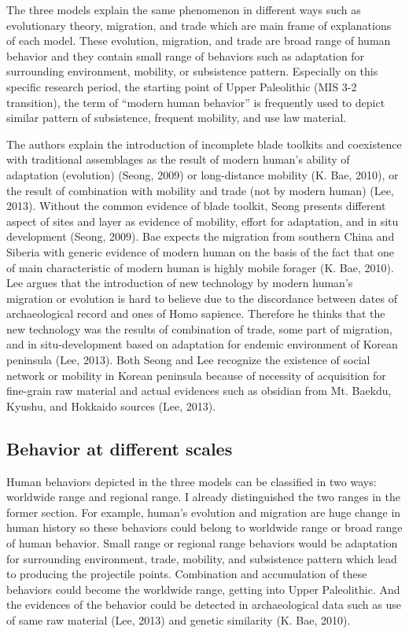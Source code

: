 \documentclass[american,man]{apa6}
\begin{document}
The three models explain the same phenomenon in different ways such as
evolutionary theory, migration, and trade which are main frame of
explanations of each model. These evolution, migration, and trade are
broad range of human behavior and they contain small range of behaviors
such as adaptation for surrounding environment, mobility, or subsistence
pattern. Especially on this specific research period, the starting point
of Upper Paleolithic (MIS 3-2 transition), the term of \enquote{modern
human behavior} is frequently used to depict similar pattern of
subsistence, frequent mobility, and use law material.

The authors explain the introduction of incomplete blade toolkits and
coexistence with traditional assemblages as the result of modern human's
ability of adaptation (evolution) (Seong, 2009) or long-distance
mobility (K. Bae, 2010), or the result of combination with mobility and
trade (not by modern human) (Lee, 2013). Without the common evidence of
blade toolkit, Seong presents different aspect of sites and layer as
evidence of mobility, effort for adaptation, and in situ development
(Seong, 2009). Bae expects the migration from southern China and Siberia
with generic evidence of modern human on the basis of the fact that one
of main characteristic of modern human is highly mobile forager (K. Bae,
2010). Lee argues that the introduction of new technology by modern
human's migration or evolution is hard to believe due to the discordance
between dates of archaeological record and ones of Homo sapience.
Therefore he thinks that the new technology was the results of
combination of trade, some part of migration, and in situ-development
based on adaptation for endemic environment of Korean peninsula (Lee,
2013). Both Seong and Lee recognize the existence of social network or
mobility in Korean peninsula because of necessity of acquisition for
fine-grain raw material and actual evidences such as obsidian from Mt.
Baekdu, Kyushu, and Hokkaido sources (Lee, 2013).

\subsection{Behavior at different
scales}\label{behavior-at-different-scales}

Human behaviors depicted in the three models can be classified in two
ways: worldwide range and regional range. I already distinguished the
two ranges in the former section. For example, human's evolution and
migration are huge change in human history so these behaviors could
belong to worldwide range or broad range of human behavior. Small range
or regional range behaviors would be adaptation for surrounding
environment, trade, mobility, and subsistence pattern which lead to
producing the projectile points. Combination and accumulation of these
behaviors could become the worldwide range, getting into Upper
Paleolithic. And the evidences of the behavior could be detected in
archaeological data such as use of same raw material (Lee, 2013) and
genetic similarity (K. Bae, 2010).
\end{document}
